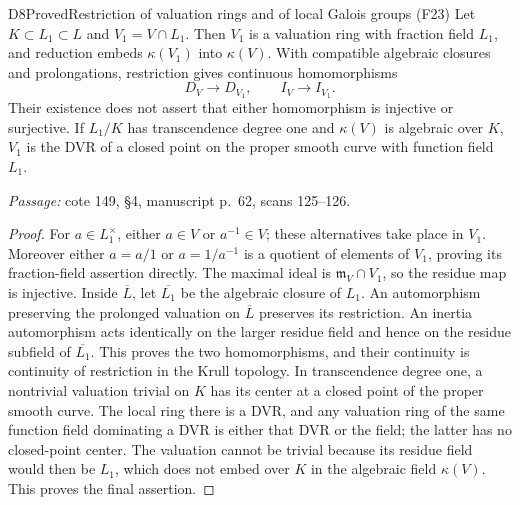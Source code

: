 \begin{result}{D8}{Proved}{Restriction of valuation rings and of local Galois groups (F23)}
Let $K\subset L_1\subset L$ and $V_1=V\cap L_1$. Then $V_1$ is a valuation ring with fraction field $L_1$, and reduction embeds $\kappa(V_1)$ into $\kappa(V)$. With compatible algebraic closures and prolongations, restriction gives continuous homomorphisms
\[
 D_V\longrightarrow D_{V_1},\qquad I_V\longrightarrow I_{V_1}.
\]
Their existence does not assert that either homomorphism is injective or surjective. If $L_1/K$ has transcendence degree one and $\kappa(V)$ is algebraic over $K$, $V_1$ is the DVR of a closed point on the proper smooth curve with function field $L_1$.
\par\emph{Passage:} cote 149, \S4, manuscript p.~62, scans 125--126.
\end{result}
\begin{proof}
For $a\in L_1^\times$, either $a\in V$ or $a^{-1}\in V$; these alternatives take place in $V_1$. Moreover either $a=a/1$ or $a=1/a^{-1}$ is a quotient of elements of $V_1$, proving its fraction-field assertion directly. The maximal ideal is $\mathfrak m_V\cap V_1$, so the residue map is injective. Inside $\overline L$, let $\overline {L_1}$ be the algebraic closure of $L_1$. An automorphism preserving the prolonged valuation on $\overline L$ preserves its restriction. An inertia automorphism acts identically on the larger residue field and hence on the residue subfield of $\overline {L_1}$. This proves the two homomorphisms, and their continuity is continuity of restriction in the Krull topology.
In transcendence degree one, a nontrivial valuation trivial on $K$ has its center at a closed point of the proper smooth curve. The local ring there is a DVR, and any valuation ring of the same function field dominating a DVR is either that DVR or the field; the latter has no closed-point center. The valuation cannot be trivial because its residue field would then be $L_1$, which does not embed over $K$ in the algebraic field $\kappa(V)$. This proves the final assertion.
\end{proof}

